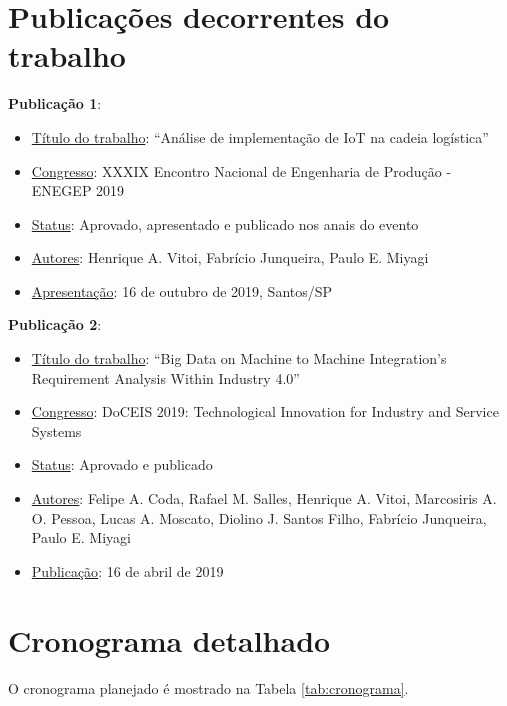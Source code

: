 \documentclass[
	12pt,				%
	oneside,			%
	a4paper,			%
	english,			%
	brazil				%
]{abntex2}
\begin{document}
	\lipsum[1-1]



\chapter{Publicações decorrentes do trabalho}

	\textbf{Publicação 1}:
	\begin{itemize}
		\item \underline{Título do trabalho}: “Análise de implementação de IoT na cadeia logística”
		\item \underline{Congresso}: XXXIX Encontro Nacional de Engenharia de Produção - ENEGEP 2019
		\item \underline{Status}: Aprovado, apresentado e publicado nos anais do evento
		\item \underline{Autores}:  Henrique A. Vitoi, Fabrício Junqueira, Paulo E. Miyagi
		\item \underline{Apresentação}: 16 de outubro de 2019, Santos/SP
	\end{itemize}
	
	\bigskip
	

	\textbf{Publicação 2}:
	\begin{itemize}
		\item \underline{Título do trabalho}: “Big Data on Machine to Machine Integration's Requirement Analysis Within Industry 4.0”
		\item \underline{Congresso}: DoCEIS 2019: Technological Innovation for Industry and Service Systems
		\item \underline{Status}: Aprovado e publicado
		\item \underline{Autores}:  Felipe A. Coda, Rafael M. Salles, Henrique A. Vitoi, Marcosiris A. O. Pessoa, Lucas A. Moscato, Diolino J. Santos Filho, Fabrício Junqueira, Paulo E. Miyagi
		\item \underline{Publicação}: 16 de abril de 2019
	\end{itemize}




\chapter{Cronograma detalhado}

	O cronograma planejado é mostrado na Tabela \ref{tab:cronograma}.
	
\end{document}
